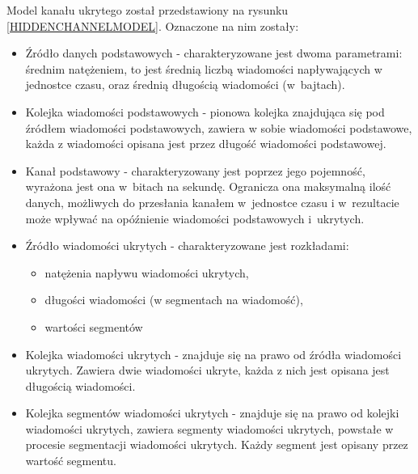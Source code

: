\documentclass[a4paper, twoside, 12pt]{report}
\begin{document}
    Model kanału ukrytego został przedstawiony na rysunku \ref{HIDDENCHANNELMODEL}.
    Oznaczone na nim zostały:
    \begin{itemize}
        \item Źródło danych podstawowych -
    charakteryzowane jest dwoma parametrami: średnim natężeniem, to jest średnią liczbą
    wiadomości napływających w jednostce czasu, oraz średnią długością wiadomości (w~bajtach).
        \item Kolejka wiadomości podstawowych - pionowa kolejka znajdująca się pod
    źródłem wiadomości podstawowych, zawiera w sobie wiadomości podstawowe,
    każda z wiadomości opisana jest przez długość wiadomości podstawowej.
        \item Kanał podstawowy - charakteryzowany jest
    poprzez jego pojemność, wyrażona jest ona w~bitach na sekundę. Ogranicza ona
    maksymalną ilość danych, możliwych do przesłania kanałem w~jednostce czasu i
    w~rezultacie może wpływać na opóźnienie wiadomości podstawowych i~ukrytych.
        \item Źródło wiadomości ukrytych - charakteryzowane jest rozkładami:
            \begin{itemize}
                \item natężenia napływu wiadomości ukrytych,
                \item długości wiadomości (w segmentach na wiadomość),
                \item wartości segmentów
            \end{itemize}
        \item Kolejka wiadomości ukrytych - znajduje się na prawo od źródła wiadomości ukrytych.
            Zawiera dwie wiadomości ukryte, każda z nich jest opisana jest długością wiadomości.
        \item Kolejka segmentów wiadomości ukrytych - znajduje się na prawo od kolejki
            wiadomości ukrytych, zawiera segmenty wiadomości ukrytych, powstałe w procesie
            segmentacji wiadomości ukrytych. Każdy segment jest opisany przez wartość segmentu.
    \end{itemize}
\end{document}
